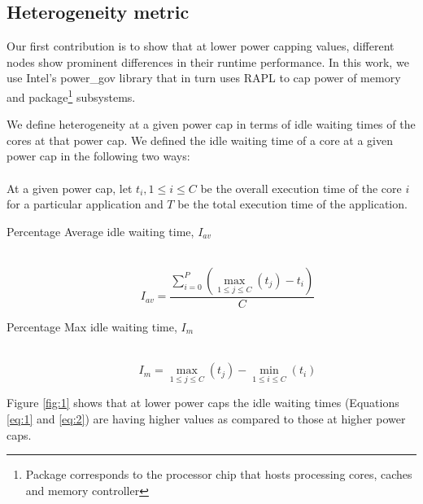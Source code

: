 \subsection{Heterogeneity metric}
Our first contribution is to show that at lower power capping values, different
nodes show prominent differences in their runtime performance.  In this work,
      we use Intel's power\_gov library\cite{power_gov} that in turn uses RAPL
      \cite{rapl} to cap power of memory and package\footnote{Package
        corresponds to the processor chip that hosts processing cores, caches
          and memory controller} subsystems.


We define heterogeneity at a given power cap in terms of idle waiting times of
the cores at that power cap.  We defined the idle waiting time of a core at a
given power cap in the following two ways: 
\\ 
\\
\noindent At a given power cap, let  $t_{i}, 1\leq i \leq C$  be the overall
execution time of the core $i$ for a particular application and $T$ be the
total execution time of the application.  

\begin{description}
  \item[Percentage Average idle waiting time, $I_{av}$] \hfill \\ 
    \begin{equation} \label{eq:1}
      I_{av} = \frac{\displaystyle\sum\limits_{i=0}^P (\displaystyle\max_{1\leq j \leq C} ( t_{j} ) - t_{i})}{C}
    \end{equation}
  \item[Percentage Max idle waiting time, $I_{m}$] \hfill \\
    \begin{equation} \label{eq:2}
      I_{m} = \displaystyle\max_{1\leq j \leq C} ( t_{j} ) -  \displaystyle\min_{1\leq i \leq C} ( t_{i} )
    \end{equation}
\end{description}

Figure \ref{fig:1} shows that at lower power caps the
idle waiting times (Equations \eqref{eq:1} and \eqref{eq:2}) are having higher values as
compared to those at higher power caps. 

